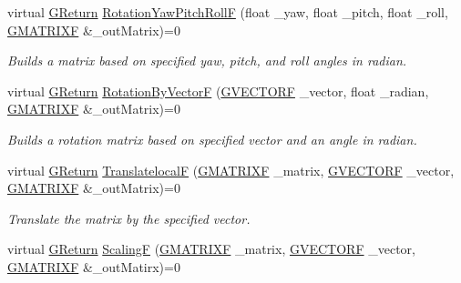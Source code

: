 \begin{DoxyCompactItemize}
virtual \mbox{\hyperlink{namespace_g_w_a67a839e3df7ea8a5c5686613a7a3de21}{G\+Return}} \mbox{\hyperlink{class_g_w_1_1_m_a_t_h_1_1_g_matrix_a821ff1b8cda633278f4d0088d2063d4d}{Rotation\+Yaw\+Pitch\+RollF}} (float \+\_\+yaw, float \+\_\+pitch, float \+\_\+roll, \mbox{\hyperlink{struct_g_w_1_1_m_a_t_h_1_1_g_m_a_t_r_i_x_f}{G\+M\+A\+T\+R\+I\+XF}} \&\+\_\+out\+Matrix)=0
\begin{DoxyCompactList}\small\item\em Builds a matrix based on specified yaw, pitch, and roll angles in radian. \end{DoxyCompactList}\item 
virtual \mbox{\hyperlink{namespace_g_w_a67a839e3df7ea8a5c5686613a7a3de21}{G\+Return}} \mbox{\hyperlink{class_g_w_1_1_m_a_t_h_1_1_g_matrix_a2dded0d4aa97a7b6c1b885292a441574}{Rotation\+By\+VectorF}} (\mbox{\hyperlink{struct_g_w_1_1_m_a_t_h_1_1_g_v_e_c_t_o_r_f}{G\+V\+E\+C\+T\+O\+RF}} \+\_\+vector, float \+\_\+radian, \mbox{\hyperlink{struct_g_w_1_1_m_a_t_h_1_1_g_m_a_t_r_i_x_f}{G\+M\+A\+T\+R\+I\+XF}} \&\+\_\+out\+Matrix)=0
\begin{DoxyCompactList}\small\item\em Builds a rotation matrix based on specified vector and an angle in radian. \end{DoxyCompactList}\item 
virtual \mbox{\hyperlink{namespace_g_w_a67a839e3df7ea8a5c5686613a7a3de21}{G\+Return}} \mbox{\hyperlink{class_g_w_1_1_m_a_t_h_1_1_g_matrix_aee43c6ff9c28dbac026b529bef61c236}{TranslatelocalF}} (\mbox{\hyperlink{struct_g_w_1_1_m_a_t_h_1_1_g_m_a_t_r_i_x_f}{G\+M\+A\+T\+R\+I\+XF}} \+\_\+matrix, \mbox{\hyperlink{struct_g_w_1_1_m_a_t_h_1_1_g_v_e_c_t_o_r_f}{G\+V\+E\+C\+T\+O\+RF}} \+\_\+vector, \mbox{\hyperlink{struct_g_w_1_1_m_a_t_h_1_1_g_m_a_t_r_i_x_f}{G\+M\+A\+T\+R\+I\+XF}} \&\+\_\+out\+Matrix)=0
\begin{DoxyCompactList}\small\item\em Translate the matrix by the specified vector. \end{DoxyCompactList}\item 
virtual \mbox{\hyperlink{namespace_g_w_a67a839e3df7ea8a5c5686613a7a3de21}{G\+Return}} \mbox{\hyperlink{class_g_w_1_1_m_a_t_h_1_1_g_matrix_a4342d54e82d03d18e493368e87e90137}{ScalingF}} (\mbox{\hyperlink{struct_g_w_1_1_m_a_t_h_1_1_g_m_a_t_r_i_x_f}{G\+M\+A\+T\+R\+I\+XF}} \+\_\+matrix, \mbox{\hyperlink{struct_g_w_1_1_m_a_t_h_1_1_g_v_e_c_t_o_r_f}{G\+V\+E\+C\+T\+O\+RF}} \+\_\+vector, \mbox{\hyperlink{struct_g_w_1_1_m_a_t_h_1_1_g_m_a_t_r_i_x_f}{G\+M\+A\+T\+R\+I\+XF}} \&\+\_\+out\+Matirx)=0

\end{DoxyCompactItemize}
